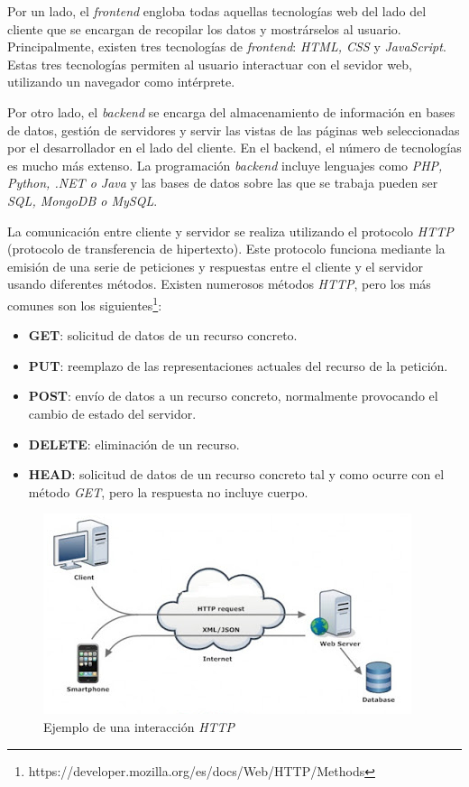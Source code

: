 Por un lado, el \textit{frontend} engloba todas aquellas tecnologías web del lado del cliente que se encargan de recopilar los datos y mostrárselos al usuario. Principalmente, existen tres tecnologías de \textit{frontend}: \textit{HTML, CSS} y \textit{JavaScript}. Estas tres tecnologías permiten al usuario interactuar con el sevidor web, utilizando un navegador como intérprete. \newline 

Por otro lado, el \textit{backend} se encarga del almacenamiento de información en bases de datos, gestión de servidores y servir las vistas de las páginas web seleccionadas por el desarrollador en el lado del cliente. En el backend, el número de tecnologías es mucho más extenso. La programación \textit{backend} incluye lenguajes como \textit{PHP, Python, .NET o Java }y las bases de datos sobre las que se trabaja pueden ser \textit{SQL, MongoDB o MySQL}. \newline 

La comunicación entre cliente y servidor se realiza utilizando el protocolo \textit{HTTP} (protocolo de transferencia de hipertexto). Este protocolo funciona mediante la emisión de una serie de peticiones y respuestas entre el cliente y el servidor usando diferentes métodos. Existen numerosos métodos \textit{HTTP}, pero los más comunes son los siguientes\footnote{https://developer.mozilla.org/es/docs/Web/HTTP/Methods}:

\begin{itemize}
    \item \textbf{GET}: solicitud de datos de un recurso concreto.
    \item \textbf{PUT}: reemplazo de las representaciones actuales del recurso de la petición.
    \item \textbf{POST}: envío de datos a un recurso concreto, normalmente provocando el cambio de estado del servidor.
    \item \textbf{DELETE}: eliminación de un recurso.
     \item \textbf{HEAD}: solicitud de datos de un recurso concreto tal y como ocurre con el método \textit{GET}, pero la respuesta no incluye cuerpo.
\end{itemize}

\begin{figure}[h!]
    \centering
    \includegraphics[scale=1]{http.png}
    \caption{Ejemplo de una interacción \textit{HTTP} \footnotemark}
    \label{fig:http}
\end{figure}

